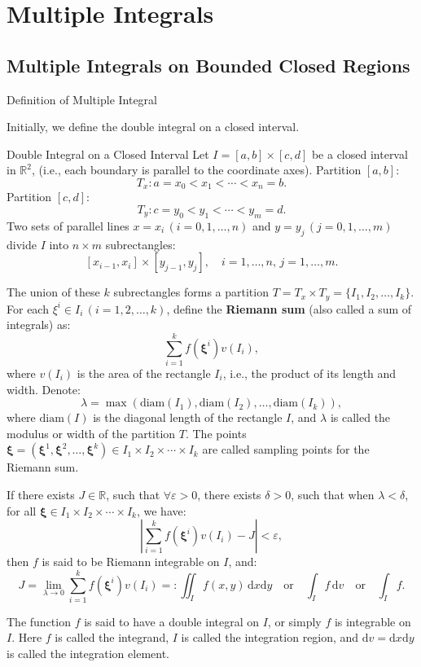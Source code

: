 \documentclass[11pt]{../../TexTemplate/elegantbook}
\begin{document}
\chapter{Multiple Integrals}
\section{Multiple Integrals on Bounded Closed Regions}
\begin{leftbarTitle}{Definition of Multiple Integral}\end{leftbarTitle}

Initially, we define the double integral on a closed interval.
\begin{definition}{Double Integral on a Closed Interval}
    Let \( I = [a, b] \times [c, d] \) be a closed interval in \( \mathbb{R}^2 \), 
    (i.e., each boundary is parallel to the coordinate axes). Partition \( [a, b] \):
    \[
    T_x: a = x_0 < x_1 < \cdots < x_n = b.
    \]
    Partition \( [c, d] \):
    \[
    T_y: c = y_0 < y_1 < \cdots < y_m = d.
    \]
    Two sets of parallel lines \( x = x_i \, (i = 0, 1, \ldots, n) \) and \( y = y_j \, (j = 0, 1, \ldots, m) \) 
    divide \( I \) into \( n \times m \) subrectangles:
    \[
    [x_{i-1}, x_i] \times [y_{j-1}, y_j], \quad i = 1, \ldots, n, \, j = 1, \ldots, m.
    \]

    The union of these \( k \) subrectangles forms a partition \( T = T_x \times T_y = \{ I_1, I_2, \ldots, I_k \} \). 
    For each \( \xi^i \in I_i \, (i = 1, 2, \ldots, k) \), define the \textbf{Riemann sum} (also called a sum of integrals) as:
    \[
    \sum_{i=1}^k f(\boldsymbol{\xi}^i) v(I_i),
    \]
    where \( v(I_i) \) is the area of the rectangle \( I_i \), i.e., the product of its length and width. Denote:
    \[
    \lambda = \max(\text{diam}(I_1), \text{diam}(I_2), \ldots, \text{diam}(I_k)),
    \]
    where \( \text{diam}(I) \) is the diagonal length of the rectangle \( I \), 
    and \( \lambda \) is called the modulus or width of the partition \( T \). 
    The points 
    \( \boldsymbol{\xi} = (\boldsymbol{\xi}^1, \boldsymbol{\xi}^2, \ldots, \boldsymbol{\xi}^k) 
    \in I_1 \times I_2 \times \cdots \times I_k \) 
    are called sampling points for the Riemann sum.

    If there exists \( J \in \mathbb{R} \), such that \( \forall \varepsilon > 0 \), there exists \( \delta > 0 \), 
    such that when \( \lambda < \delta \), for all \( \boldsymbol{\xi} \in I_1 \times I_2 \times \cdots \times I_k \), we have:
    \[
    \left| \sum_{i=1}^k f(\boldsymbol{\xi}^i) v(I_i) - J \right| < \varepsilon,
    \]
    then \( f \) is said to be Riemann integrable on \( I \), and:
    \[
    J = \lim_{\lambda \to 0} \sum_{i=1}^k f(\boldsymbol{\xi}^i) v(I_i) =: 
    \iint_I f(x, y) \, \mathrm{d}x \mathrm{d}y \quad \text{or} \quad \int_I f \, \mathrm{d}v \quad \text{or} \quad \int_{I} f.
    \]

    The function \( f \) is said to have a double integral on \( I \), or simply \( f \) is integrable on \( I \). 
    Here \( f \) is called the integrand, \( I \) is called the integration region, 
    and \( \mathrm{d}v = \mathrm{d}x \mathrm{d}y \) is called the integration element.
\end{definition}
\end{document}
